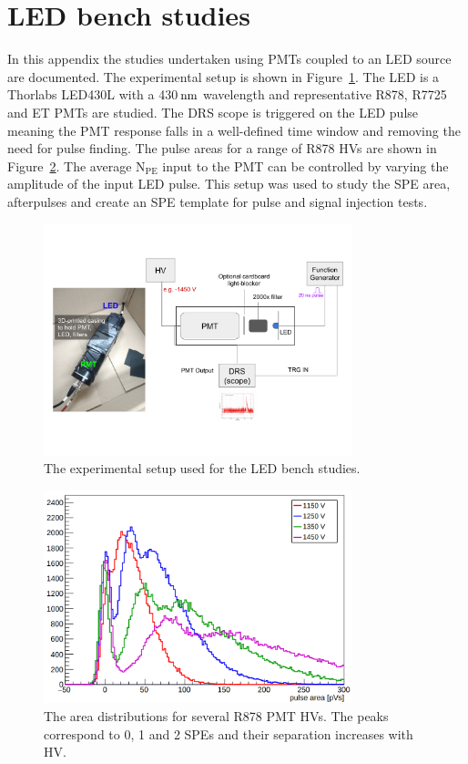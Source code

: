 \documentclass[12pt]{article}
\newcommand{\unit}[1]{\ensuremath{\text{\,#1}}\xspace}
\newcommand{\npe} {\mbox{\ensuremath{\textrm{N}_\textrm{PE}}}\xspace}
\begin{document}
\appendix
\section{LED bench studies}
\label{app:speLEDCalib}
In this appendix the studies undertaken using PMTs coupled to an LED source are documented.
The experimental setup is shown in Figure~\ref{fig:LEDSetup}. The LED is a Thorlabs LED430L with a 430\unit{nm} wavelength 
and representative R878, R7725 and ET PMTs are studied. The DRS scope is triggered on
the LED pulse meaning the PMT response falls in a well-defined time window 
and removing the need for pulse finding. The pulse areas for a range of R878 HVs are
shown in Figure~\ref{fig:LEDPulseAreas}. The average \npe input to the PMT can be controlled by varying the amplitude of the input LED pulse.
This setup was used to study the SPE area, afterpulses and create an SPE template for 
pulse and signal injection tests. 

\begin{figure}[ht!]
    \centering
    \includegraphics[width=0.8\textwidth]{figures/LEDsetup}
    \caption{\label{fig:LEDSetup} The experimental setup used for the LED bench studies. }
\end{figure}


\begin{figure}[ht!]
    \centering
    \includegraphics[width=0.8\textwidth]{figures/LEDareas}
    \caption{\label{fig:LEDPulseAreas} The area distributions for several R878 PMT HVs. The peaks correspond 
    to 0, 1 and 2 SPEs and their separation increases with HV.}
\end{figure}
\end{document}
